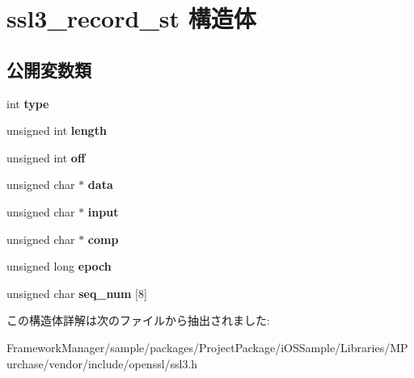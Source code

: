 \hypertarget{structssl3__record__st}{}\section{ssl3\+\_\+record\+\_\+st 構造体}
\label{structssl3__record__st}
\subsection*{公開変数類}
\begin{DoxyCompactItemize}
\item 
\hypertarget{structssl3__record__st_a51d0757184a963149122f4c020897002}{}int {\bfseries type}\label{structssl3__record__st_a51d0757184a963149122f4c020897002}

\item 
\hypertarget{structssl3__record__st_ac7ca2fdc9d81e439c02b314c3f6b44e0}{}unsigned int {\bfseries length}\label{structssl3__record__st_ac7ca2fdc9d81e439c02b314c3f6b44e0}

\item 
\hypertarget{structssl3__record__st_a6e1645baa9d3a07247d82d15cf54498a}{}unsigned int {\bfseries off}\label{structssl3__record__st_a6e1645baa9d3a07247d82d15cf54498a}

\item 
\hypertarget{structssl3__record__st_af6fe1b3b1e64483b05e1ede9e19607d2}{}unsigned char $\ast$ {\bfseries data}\label{structssl3__record__st_af6fe1b3b1e64483b05e1ede9e19607d2}

\item 
\hypertarget{structssl3__record__st_aa3a1dee09fd5b0a2732d43cfd81850b8}{}unsigned char $\ast$ {\bfseries input}\label{structssl3__record__st_aa3a1dee09fd5b0a2732d43cfd81850b8}

\item 
\hypertarget{structssl3__record__st_a887d4ab9a66dbea8ff63648d9baa42cb}{}unsigned char $\ast$ {\bfseries comp}\label{structssl3__record__st_a887d4ab9a66dbea8ff63648d9baa42cb}

\item 
\hypertarget{structssl3__record__st_a52c7ebb11114cf6efca3bbe70a7e0c31}{}unsigned long {\bfseries epoch}\label{structssl3__record__st_a52c7ebb11114cf6efca3bbe70a7e0c31}

\item 
\hypertarget{structssl3__record__st_ab6ec6fd50c32c24851277e3e5f70f38f}{}unsigned char {\bfseries seq\+\_\+num} \mbox{[}8\mbox{]}\label{structssl3__record__st_ab6ec6fd50c32c24851277e3e5f70f38f}

\end{DoxyCompactItemize}


この構造体詳解は次のファイルから抽出されました\+:\begin{DoxyCompactItemize}
\item 
Framework\+Manager/sample/packages/\+Project\+Package/i\+O\+S\+Sample/\+Libraries/\+M\+Purchase/vendor/include/openssl/ssl3.\+h\end{DoxyCompactItemize}
